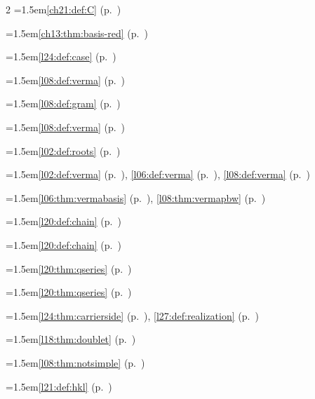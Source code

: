 \begin{multicols}{2}
\hangindent=1.5em\quad \ref{ch21:def:C} (p.~\pageref{ch21:def:C})\par
\hangindent=1.5em\quad \ref{ch13:thm:basis-red} (p.~\pageref{ch13:thm:basis-red})\par
\hangindent=1.5em\quad \ref{l24:def:case} (p.~\pageref{l24:def:case})\par
\hangindent=1.5em\quad \ref{l08:def:verma} (p.~\pageref{l08:def:verma})\par
\hangindent=1.5em\quad \ref{l08:def:gram} (p.~\pageref{l08:def:gram})\par
\hangindent=1.5em\quad \ref{l08:def:verma} (p.~\pageref{l08:def:verma})\par
\hangindent=1.5em\quad \ref{l02:def:roots} (p.~\pageref{l02:def:roots})\par
\hangindent=1.5em\quad \ref{l02:def:verma} (p.~\pageref{l02:def:verma}), \ref{l06:def:verma} (p.~\pageref{l06:def:verma}), \ref{l08:def:verma} (p.~\pageref{l08:def:verma})\par
\hangindent=1.5em\quad \ref{l06:thm:vermabasis} (p.~\pageref{l06:thm:vermabasis}), \ref{l08:thm:vermapbw} (p.~\pageref{l08:thm:vermapbw})\par
\hangindent=1.5em\quad \ref{l20:def:chain} (p.~\pageref{l20:def:chain})\par
\hangindent=1.5em\quad \ref{l20:def:chain} (p.~\pageref{l20:def:chain})\par
\hangindent=1.5em\quad \ref{l20:thm:qseries} (p.~\pageref{l20:thm:qseries})\par
\hangindent=1.5em\quad \ref{l20:thm:qseries} (p.~\pageref{l20:thm:qseries})\par
\hangindent=1.5em\quad \ref{l24:thm:carrierside} (p.~\pageref{l24:thm:carrierside}), \ref{l27:def:realization} (p.~\pageref{l27:def:realization})\par
\hangindent=1.5em\quad \ref{l18:thm:doublet} (p.~\pageref{l18:thm:doublet})\par
\hangindent=1.5em\quad \ref{l08:thm:notsimple} (p.~\pageref{l08:thm:notsimple})\par
\hangindent=1.5em\quad \ref{l21:def:hkl} (p.~\pageref{l21:def:hkl})\par

\end{multicols}
